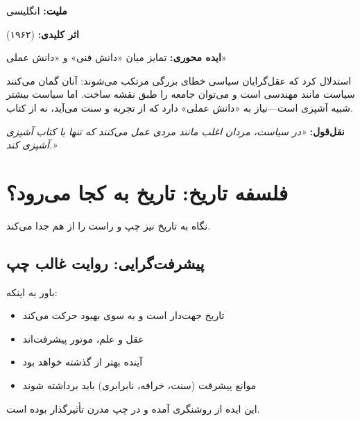 \begin{personbox}
	
	\textbf{ملیت:} انگلیسی
	
	\textbf{اثر کلیدی:}  (۱۹۶۲)
	
	\textbf{ایده محوری:} تمایز میان «دانش فنی» و «دانش عملی»
	
	\mediumspace
	
	 استدلال کرد که عقل‌گرایان سیاسی خطای بزرگی مرتکب می‌شوند: آنان گمان می‌کنند سیاست مانند مهندسی است و می‌توان جامعه را طبق نقشه ساخت. اما سیاست بیشتر شبیه آشپزی است—نیاز به «دانش عملی» دارد که از تجربه و سنت می‌آید، نه از کتاب.
	
	\mediumspace
	
	\textbf{نقل‌قول:} \textit{«در سیاست، مردان اغلب مانند مردی عمل می‌کنند که تنها با کتاب آشپزی آشپزی کند.»}
\end{personbox}

\section{فلسفه تاریخ: تاریخ به کجا می‌رود؟}

نگاه به تاریخ نیز چپ و راست را از هم جدا می‌کند.

\subsection{پیشرفت‌گرایی: روایت غالب چپ}

\begin{defbox}
	باور به اینکه:
	\begin{itemize}[nosep]
		\item تاریخ جهت‌دار است و به سوی بهبود حرکت می‌کند
		\item عقل و علم، موتور پیشرفت‌اند
		\item آینده بهتر از گذشته خواهد بود
		\item موانع پیشرفت (سنت، خرافه، نابرابری) باید برداشته شوند
	\end{itemize}
	این ایده از روشنگری آمده و در چپ مدرن تأثیرگذار بوده است.
\end{defbox}

\vspace{-4pt}

